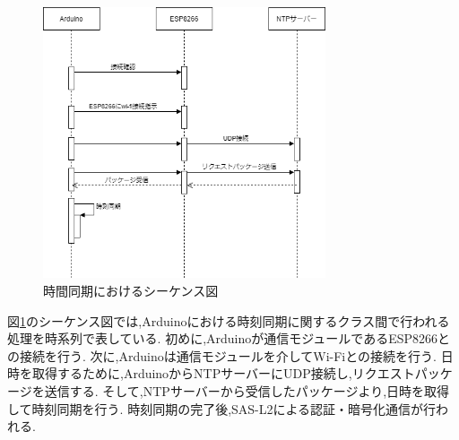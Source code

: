 \begin{figure}[H]
\begin{center}
	\includegraphics[height=80mm]{time_sequence.png}
	\caption{時間同期におけるシーケンス図}
	\label{fig:time_sequence}
\end{center}
\end{figure}
図\ref{fig:time_sequence}のシーケンス図では,Arduinoにおける時刻同期に関するクラス間で行われる処理を時系列で表している.
初めに,Arduinoが通信モジュールであるESP8266との接続を行う.
次に,Arduinoは通信モジュールを介してWi-Fiとの接続を行う.
日時を取得するために,ArduinoからNTPサーバーにUDP接続し,リクエストパッケージを送信する.
そして,NTPサーバーから受信したパッケージより,日時を取得して時刻同期を行う.
時刻同期の完了後,SAS-L2による認証・暗号化通信が行われる.

